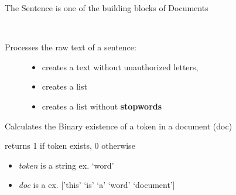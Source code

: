 \documentclass[letterpaper,10pt,english]{sphinxmanual}
\begin{document}
\begin{fulllineitems}
\label{theseus:theseus.Sentence}
The Sentence is one of the building blocks of Documents

\begin{fulllineitems}
\label{theseus:theseus.Sentence.cleanText}~\begin{description}
\item[{Processes the raw text of a sentence:}] \leavevmode\begin{itemize}
\item {} 
creates a  text without unauthorized letters,

\item {} 
creates a  list

\item {} 
creates a  list without \textbf{stopwords}

\end{itemize}

\end{description}

\end{fulllineitems}


\end{fulllineitems}


\begin{fulllineitems}
\label{theseus:theseus.binary}
Calculates the Binary existence of a token in a document (doc)

returns 1 if token exists, 0 otherwise
\begin{itemize}
\item {} 
\emph{token} is a string               ex. `word'

\item {} 
\emph{doc} is a                  ex. {[}'this' `is' `a' `word' `document'{]}

\end{itemize}

\end{fulllineitems}

\end{document}
